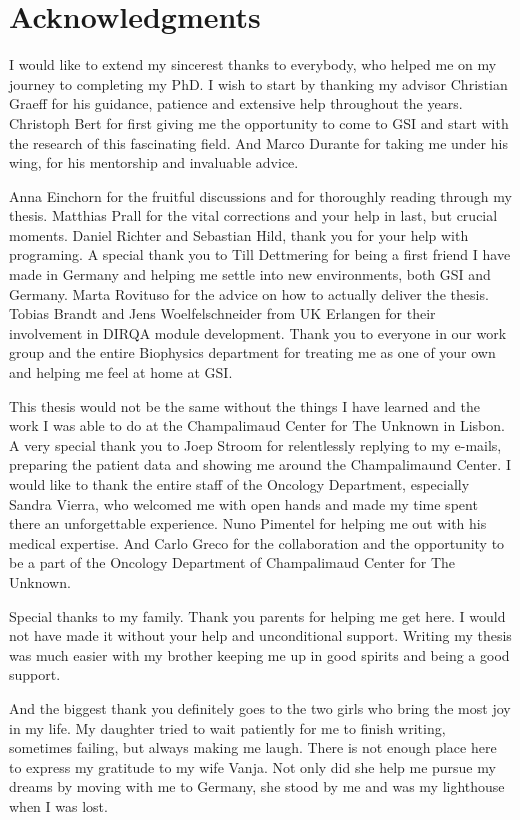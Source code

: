 

\chapter*{Acknowledgments}

I would like to extend my sincerest thanks to everybody, who helped me on my journey to completing my PhD.
I wish to start by thanking my advisor Christian Graeff for his guidance, patience and extensive help throughout the years. 
Christoph Bert for first giving me the opportunity to come to GSI and start with the research of this fascinating field. And Marco Durante for taking me under his wing, for his mentorship and invaluable advice.  

Anna Einchorn for the fruitful discussions and for thoroughly reading through my thesis. Matthias Prall for the vital corrections and your help in last, but crucial moments. Daniel Richter and Sebastian Hild, thank you for your help with programing.
A special thank you to Till Dettmering for being a first friend I have made in Germany and helping me settle into new environments, both GSI and Germany. 
Marta Rovituso for the advice on how to actually deliver the thesis. Tobias Brandt and Jens Woelfelschneider from UK Erlangen for their involvement in DIRQA module development.
Thank you to everyone in our work group and the entire Biophysics department for treating me as one of your own and helping me feel at home at GSI. 

This thesis would not be the same without the things I have learned and the work I was able to do at the Champalimaud Center for The Unknown in Lisbon.
A very special thank you to Joep Stroom for relentlessly replying to my e-mails, preparing the patient data and showing me around the Champalimaund Center.
I would like to thank the entire staff of the Oncology Department, especially Sandra Vierra, who welcomed me with open hands and made my time spent there an unforgettable experience. 
Nuno Pimentel for helping me out with his medical expertise. And Carlo Greco for the collaboration and the opportunity to be a part of the Oncology Department of Champalimaud Center for The Unknown.

Special thanks to my family. Thank you parents for helping me get here. I would not have made it without your help and unconditional support. Writing my thesis was much easier with my brother keeping me up in good spirits
and being a good support.

And the biggest thank you definitely goes to the two girls who bring the most joy in my life. 
My daughter tried to wait patiently for me to finish writing, sometimes failing, but always making me laugh.
There is not enough place here to express my gratitude to my wife Vanja. Not only did she help me pursue my dreams by moving with me to Germany, she stood by me and was my lighthouse when I was lost.



